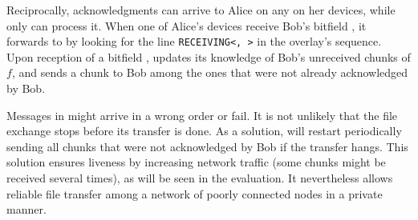 Reciprocally, acknowledgments can arrive to Alice on any on her devices, while only \sendingdevice can process it.
When one of Alice's devices receive Bob's bitfield \bitfield, 
it forwards \bitfield to \sendingdevice by looking for the line \texttt{RECEIVING<\sendingdevice, \fileid>} in the \squad overlay's sequence.
Upon reception of a bitfield \bitfield, \recdevice updates its knowledge of Bob's unreceived chunks of $f$,
and sends a chunk to Bob among the ones that were not already acknowledged by Bob.

Messages in \name might arrive in a wrong order or fail. 
It is not unlikely that the file exchange stops before its transfer is done.
As a solution, \sendingdevice will restart periodically sending all chunks that were not acknowledged by Bob if the transfer hangs.
This solution ensures liveness by increasing network traffic (some chunks might be received several times), as will be seen in the evaluation.
It nevertheless allows reliable file transfer among a network of poorly connected nodes in a private manner.